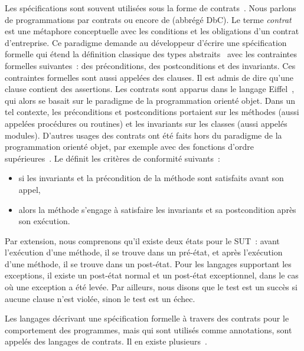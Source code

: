 Les spécifications sont souvent utilisées sous la forme de {\strong
contrats}~. Nous parlons de programmations par contrats
ou encore de  (abbrégé DbC). Le terme {\em
contrat} est une métaphore conceptuelle avec les conditions et les obligations
d'un contrat d'entreprise. Ce paradigme demande au développeur d'écrire une
spécification formelle qui étend la définition classique des types
abstraits~ avec les contraintes formelles suivantes~: des
{\strong préconditions}, des {\strong postconditions} et des {\strong
invariants}. Ces contraintes formelles sont aussi appelées des {\strong
clauses}. Il est admis de dire qu'une clause contient des {\strong assertions}.
Les contrats sont apparus dans le langage Eiffel~, qui alors se
basait sur le paradigme de la programmation orienté objet. Dans un tel contexte,
les préconditions et postconditions portaient sur les méthodes (aussi appelées
procédures ou routines) et les invariants sur les classes (aussi appelés
modules). D'autres usages des contrats ont été faits hors du paradigme de la
programmation orienté objet, par exemple avec des fonctions d'ordre
supérieures~. Le  définit les
critères de conformité suivants~:

\begin{itemize}

\item si les invariants et la précondition de la méthode sont satisfaits avant
son appel,

\item alors la méthode s'engage à satisfaire les invariants et sa postcondition
après son exécution.

\end{itemize}

Par extension, nous comprenons qu'il existe deux états pour le SUT~: avant
l'exécution d'une méthode, il se trouve dans un {\strong pré-état}, et après
l'exécution d'une méthode, il se trouve dans un {\strong post-état}. Pour les
langages supportant les exceptions, il existe un post-état normal et un
post-état exceptionnel, dans le cas où une exception a été levée. Par ailleurs,
nous disons que le test est un {\strong succès} si aucune clause n'est violée,
sinon le test est un {\strong échec}.

Les langages décrivant une spécification formelle à travers des contrats pour
le comportement des programmes, mais qui sont utilisés comme annotations, sont
appelés des {\strong langages de contrats}. Il en existe
plusieurs~.

